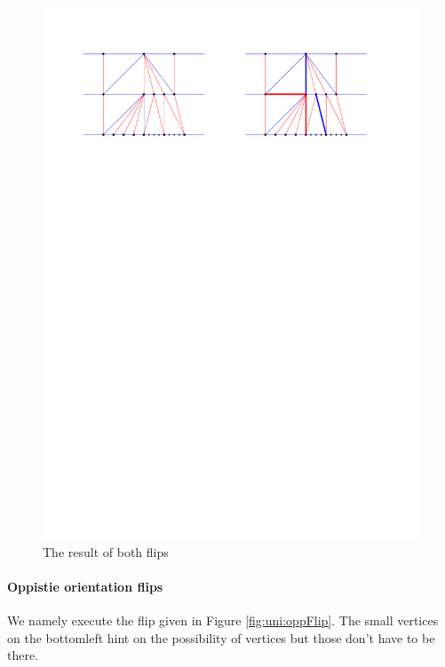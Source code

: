    \begin{figure}[h]
     \centering
     \includegraphics[width =\textwidth]{unifiedAlgo/img/post/sameFlipComplete}
     \caption{The result of both flips}
     \label{fig:uni:sameFlipComplete}
   \end{figure}



   \paragraph{Oppistie orientation flips}
   We namely execute the flip given in Figure \ref{fig:uni:oppFlip}. The small vertices on the bottomleft hint on the possibility of vertices but those don't have to be there.

